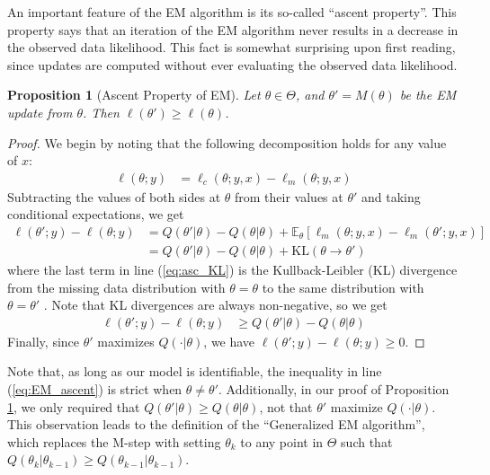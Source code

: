 \documentclass[ss]{imsart}
\theoremstyle{plain}
\newtheorem{proposition}{Proposition}[section]
\theoremstyle{definition}
\theoremstyle{remark}
\newcommand{\bE}{\mathbb{E}}
\begin{document}
An important feature of the EM algorithm is its so-called ``ascent property''. This property says that an iteration of the EM algorithm never results in a decrease in the observed data likelihood. This fact is somewhat surprising upon first reading, since updates are computed without ever evaluating the observed data likelihood. 

\begin{proposition}[Ascent Property of EM]
    \label{thm2:EM_ascent}
    Let $\theta \in \Theta$, and $\theta' = M(\theta)$ be the EM update from $\theta$. Then $\ell(\theta') \geq \ell(\theta)$.
\end{proposition}

\begin{proof}
    We begin by noting that the following decomposition holds for any value of $x$:
    \begin{align}
        \ell(\theta; y) &= \ell_c(\theta; y, x) - \ell_m(\theta; y, x)
    \end{align}
    Subtracting the values of both sides at $\theta$ from their values at $\theta'$ and taking conditional expectations, we get
    \begin{align}
        \ell(\theta'; y) - \ell(\theta; y) &= Q(\theta'|\theta) - Q(\theta|\theta) + \bE_{\theta}[\ell_m(\theta; y, x) - \ell_m(\theta'; y, x)]\\
        &= Q(\theta'|\theta) - Q(\theta|\theta) + \mathrm{KL}(\theta \rightarrow \theta') \label{eq:asc_KL}
    \end{align}
    where the last term in line (\ref{eq:asc_KL}) is the Kullback-Leibler (KL) divergence from the missing data distribution with $\theta = \theta$ to the same distribution with $\theta = \theta'$ \citep{van98}. Note that KL divergences are always non-negative, so we get
    \begin{align}
    \ell(\theta'; y) - \ell(\theta; y) &\geq Q(\theta'|\theta) - Q(\theta|\theta)  \label{eq:EM_ascent}  
    \end{align}
    Finally, since $\theta'$ maximizes $Q(\cdot|\theta)$, we have $\ell(\theta'; y) - \ell(\theta; y) \geq 0$.
\end{proof}

Note that, as long as our model is identifiable, the inequality in line (\ref{eq:EM_ascent}) is strict when $\theta \neq \theta'$. Additionally, in our proof of Proposition \ref{thm2:EM_ascent}, we only required that $Q(\theta'|\theta) \geq Q(\theta|\theta)$, not that $\theta'$ maximize $Q(\cdot|\theta)$. This observation leads to the definition of the ``Generalized EM algorithm'', which replaces the M-step with setting $\theta_k$ to any point in $\Theta$ such that $Q(\theta_k|\theta_{k-1}) \geq Q(\theta_{k-1}|\theta_{k-1})$.
\end{document}
